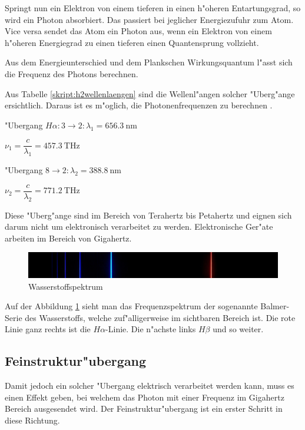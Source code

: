 \begin{refsection}
Springt nun ein Elektron von einem tieferen in einen h"oheren
Entartungsgrad, so wird ein Photon absorbiert.  Das passiert bei
jeglicher Energiezufuhr zum Atom.  Vice versa sendet das Atom ein
Photon aus, wenn ein Elektron von einem h"oheren Energiegrad zu einen
tieferen einen Quantensprung vollzieht.

Aus dem Energieunterschied und dem Plankschen Wirkungsquantum l"asst
sich die Frequenz des Photons
berechnen. %

Aus Tabelle \ref{skript:h2wellenlaengen} sind die Wellenl"angen
solcher "Uberg"ange ersichtlich. Daraus ist es m"oglich, die
Photonenfrequenzen zu berechnen \cite{Gerthsen}.
\begin{center}
	"Ubergang $H\alpha: 3 \rightarrow 2: \lambda_1 = \SI{656.3}{\nano\meter}$

$\nu_1 = \dfrac{c}{\lambda_1} = \SI{457.3}{\tera\hertz}$
\vspace{.5cm}

"Ubergang $8 \rightarrow 2: \lambda_2 = \SI{388.8}{\nano\meter}$

$\nu_2 = \dfrac{c}{\lambda_2} = \SI{771.2}{\tera\hertz}$
\end{center}	

Diese "Uberg"ange sind im Bereich von Terahertz bis Petahertz und
eignen sich darum nicht um elektronisch verarbeitet zu
werden. Elektronische Ger"ate arbeiten im Bereich von Gigahertz.

\begin{figure}
	\centering
	\includegraphics[width = .6\columnwidth]{atomuhr/wasserstoffSpektrum.jpg}
	\caption{Wasserstoffspektrum \cite{pic:wasserstoffspektrum}} 
	\label{atomuhr:wasserstoffspektrum}
\end{figure}

Auf der Abbildung \ref{atomuhr:wasserstoffspektrum} sieht man das
Frequenzspektrum der sogenannte Balmer-Serie des Wasserstoffs, welche
zuf"alligerweise im sichtbaren Bereich ist. Die rote Linie ganz rechts
ist die $H\alpha$-Linie. Die n"achste links $H\beta$ und so weiter.


\subsection{Feinstruktur"ubergang}
Damit jedoch ein solcher "Ubergang elektrisch verarbeitet werden kann,
muss es einen Effekt geben, bei welchem das Photon mit einer Frequenz
im Gigahertz Bereich ausgesendet wird.  Der Feinstruktur"ubergang ist
ein erster Schritt in diese Richtung.


\end{refsection}
